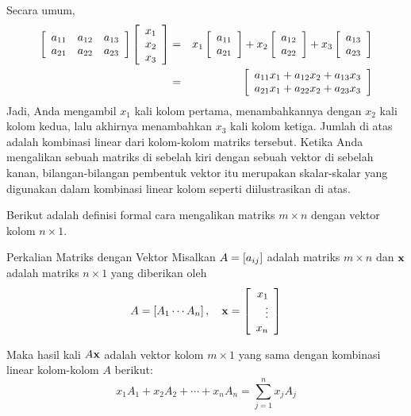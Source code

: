Secara umum,
\begin{eqnarray*}
\left[
\begin{array}{ccc}
a_{11} & a_{12} & a_{13} \\
a_{21} & a_{22} & a_{23}
\end{array}
\right] \left[
\begin{array}{c}
x_{1} \\
x_{2} \\
x_{3}
\end{array}
\right] &=&\allowbreak x_{1}\left[
\begin{array}{c}
a_{11} \\
a_{21}
\end{array}
\right] +x_{2}\left[
\begin{array}{c}
a_{12} \\
a_{22}
\end{array}
\right] +x_{3}\left[
\begin{array}{c}
a_{13} \\
a_{23}
\end{array}
\right] \\
&=&\left[
\begin{array}{c}
a_{11}x_{1}+a_{12}x_{2}+a_{13}x_{3} \\
a_{21}x_{1}+a_{22}x_{2}+a_{23}x_{3}
\end{array}
\right] 
\end{eqnarray*}
Jadi, Anda mengambil $x_{1}$ kali kolom pertama, menambahkannya dengan $x_{2}$ kali
kolom kedua, lalu akhirnya menambahkan $x_{3}$ kali kolom ketiga. Jumlah di atas adalah kombinasi linear dari kolom-kolom matriks tersebut.
Ketika Anda mengalikan sebuah matriks di sebelah kiri dengan sebuah vektor di sebelah kanan,
bilangan-bilangan pembentuk vektor itu merupakan skalar-skalar yang digunakan dalam
kombinasi linear kolom seperti diilustrasikan di atas.

Berikut adalah definisi formal cara mengalikan matriks $m\times
n $ dengan vektor kolom $ n\times 1 $.

\begin{definition}{Perkalian Matriks dengan Vektor}\label{def:multiplicationvectormatrix}
Misalkan $A=\left[ a_{ij} \right]$ adalah matriks $m\times n$ dan $\mathbf{x}$
adalah matriks $n\times 1$ yang diberikan oleh
\begin{equation*}
A=\left[ A_{1} \cdots A_{n}\right], \quad \mathbf{x} = \left[
\begin{array}{r}
x_{1} \\
\vdots \\
x_{n}
\end{array}
\right] 
\end{equation*}

Maka hasil kali $A\mathbf{x}$ adalah vektor kolom $m\times 1$
 yang sama dengan kombinasi linear
kolom-kolom $A$ berikut:
\begin{equation*}
x_{1}A_{1}+x_{2}A_{2}+\cdots +x_{n}A_{n} = 
\sum_{j=1}^{n}x_{j}A_{j}  
\end{equation*}
\end{definition}

